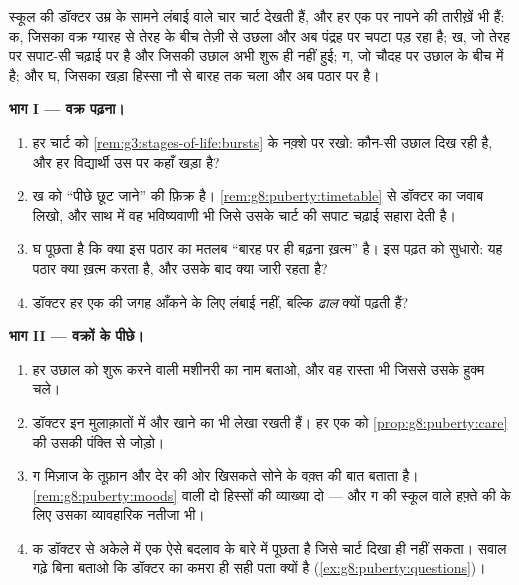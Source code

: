 \begin{problem}[{सप्ताहांत समस्या --- चार (कल्पित) वृद्धि-चार्ट, पूरे
अध्याय के साथ पढ़े हुए}]\label{pb:g8:puberty:1}
स्कूल की डॉक्टर उम्र के सामने लंबाई वाले चार चार्ट देखती हैं, और हर एक
पर नापने की तारीख़ें भी हैं: क, जिसका वक्र ग्यारह से तेरह के बीच तेज़ी
से उछला और अब पंद्रह पर चपटा पड़ रहा है; ख, जो तेरह पर सपाट-सी चढ़ाई पर
है और जिसकी उछाल अभी शुरू ही नहीं हुई; ग, जो चौदह पर उछाल के बीच में है;
और घ, जिसका खड़ा हिस्सा नौ से बारह तक चला और अब पठार पर है।

\medskip\noindent\textbf{भाग I --- वक्र पढ़ना।}
\begin{enumerate}
  \item हर चार्ट को \cref{rem:g3:stages-of-life:bursts} के नक़्शे पर
        रखो: कौन-सी उछाल दिख रही है, और हर विद्यार्थी उस पर कहाँ
        खड़ा है?
  \item ख को ``पीछे छूट जाने'' की फ़िक्र है।
        \cref{rem:g8:puberty:timetable} से डॉक्टर का जवाब लिखो, और
        साथ में वह भविष्यवाणी भी जिसे उसके चार्ट की सपाट चढ़ाई
        सहारा देती है।
  \item घ पूछता है कि क्या इस पठार का मतलब ``बारह पर ही बढ़ना ख़त्म''
        है। इस पढ़त को सुधारो: यह पठार क्या ख़त्म करता है, और उसके
        बाद क्या जारी रहता है?
  \item डॉक्टर हर एक की जगह आँकने के लिए लंबाई नहीं, बल्कि \emph{ढाल}
        क्यों पढ़ती हैं?
\end{enumerate}

\medskip\noindent\textbf{भाग II --- वक्रों के पीछे।}
\begin{enumerate}[resume]
  \item हर उछाल को शुरू करने वाली मशीनरी का नाम बताओ, और वह रास्ता भी
        जिससे उसके हुक्म चले।
  \item डॉक्टर इन मुलाक़ातों में  और खाने का भी लेखा रखती हैं।
        हर एक को \cref{prop:g8:puberty:care} की उसकी पंक्ति से
        जोड़ो।
  \item ग मिज़ाज के तूफ़ान और देर की ओर खिसकते सोने के वक़्त की बात
        बताता है। \cref{rem:g8:puberty:moods} वाली दो हिस्सों की
        व्याख्या दो --- और ग की स्कूल वाले हफ़्ते की  के लिए
        उसका व्यावहारिक नतीजा भी।
  \item क डॉक्टर से अकेले में एक ऐसे बदलाव के बारे में पूछता है
        जिसे चार्ट दिखा ही नहीं सकता। सवाल गढ़े बिना बताओ कि
        डॉक्टर का कमरा ही सही पता क्यों है
        (\cref{ex:g8:puberty:questions})।
\end{enumerate}


\end{problem}
